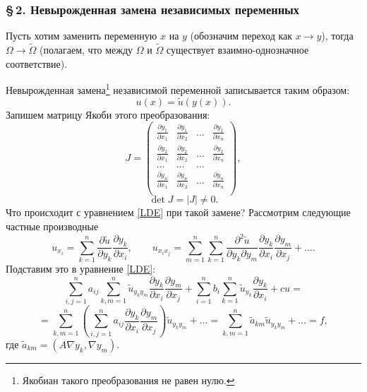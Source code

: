 \documentclass[12pt,a5paper]{book}
\begin{document}
	\subsubsection*{\S\,2. Невырожденная замена независимых переменных}
	
	Пусть хотим заменить переменную $x$ на $y$ (обозначим переход как $x \rightarrow y$), тогда $\Omega \rightarrow \tilde{\Omega}$ (полагаем, что между $\Omega$ и $\tilde{\Omega}$ существует взаимно-однозначное соответствие).
	
	Невырожденная замена\footnote{Якобиан такого преобразования не равен нулю.} независимой переменной записывается таким образом:
	\begin{equation*}
		u(x) = \tilde{u}(y(x)).
	\end{equation*}
	Запишем матрицу Якоби этого преобразования:
	\begin{equation*}
		J = \begin{pmatrix}
			\frac{\partial y_1}{\partial x_1} & \frac{\partial y_1}{\partial x_2} & \dots & \frac{\partial y_1}{\partial x_n} \\
			\frac{\partial y_2}{\partial x_1} & \frac{\partial y_2}{\partial x_2} & \dots & \frac{\partial y_2}{\partial x_n} \\
			\dots & \dots & \dots \\
			\frac{\partial y_n}{\partial x_1} & \frac{\partial y_n}{\partial x_2} & \dots & \frac{\partial y_n}{\partial x_n} \\
		\end{pmatrix},
	\end{equation*}
	\begin{equation*}
		\det{J} = |J| \neq 0.
	\end{equation*}
	Что происходит с уравнением \eqref{LDE} при такой замене? Рассмотрим следующие частные производные
	\begin{equation*}
		u_{x_i} = \sum_{k=1}^{n}{\frac{\partial\tilde{u}}{\partial y_k}\frac{\partial y_k}{\partial x_i}}, \qquad u_{x_ix_j} = \sum_{m=1}^{n}\sum_{k=1}^{n}{\frac{\partial^2\tilde{u}}{\partial y_k\partial y_m}\frac{\partial y_k}{\partial x_i}\frac{\partial y_m}{\partial x_j}} + \dots.
	\end{equation*}
	Подставим это в уравнение \eqref{LDE}:
	\begin{equation*}
		\sum_{i,j=1}^{n}a_{ij}\sum_{k,m=1}^{n}\tilde{u}_{y_ky_m}\frac{\partial y_k}{\partial x_i}\frac{\partial y_m}{\partial x_j} + \sum_{i=1}^{n}b_i\sum_{k=1}^{n}\tilde{u}_{y_k}\frac{\partial y_k}{\partial x_i} + cu =
	\end{equation*}
	\begin{equation*}
		= \sum_{k,m=1}^{n}\left(\sum_{i,j=1}^{n}a_{ij}\frac{\partial y_k}{\partial x_i}\frac{\partial y_m}{\partial x_j}\right)\tilde{u}_{y_ky_m} + \dots = \sum_{k,m=1}^{n}\tilde{a}_{km}\tilde{u}_{y_ky_m} + \dots = f,
	\end{equation*}
	где $\tilde{a}_{km} = (A\nabla y_k, \nabla y_m)$.
	
\end{document}
